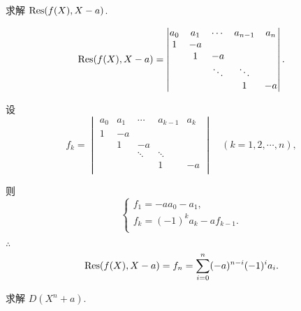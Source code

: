 \documentclass[UTF8]{ctexart}
\begin{document}
\begin{exercise}\label{ex2.7}
    求解 $\operatorname{Res} (f(X),X-a)$.
\end{exercise}
\begin{solution}
    \[\operatorname{Res} (f(X),X-a)=\begin{vmatrix}
        a_0 & a_1 & \cdots & a_{n-1} & a_n \\
        1 & -a \\
        & 1 & -a \\
        && \ddots & \ddots \\
        &&& 1 & -a \\
    \end{vmatrix}.\]

    设
    \[f_k=\begin{vmatrix}
        a_0 & a_1 & \cdots & a_{k-1} & a_k \\
        1 & -a \\
        & 1 & -a \\
        && \ddots & \ddots \\
        &&& 1 & -a \\
    \end{vmatrix}\quad(k=1,2,\cdots,n),\]

    则
    \[\begin{cases}
        f_1=-aa_0-a_1, \\
        f_k=(-1)^ka_k-af_{k-1}. \\
    \end{cases}\]

    $\therefore$
    \[\operatorname{Res} (f(X),X-a)=f_n=\sum\limits_{i=0}^n(-a)^{n-i}(-1)^ia_i.\]
\end{solution}
\begin{exercise}\label{ex2.8}
    求解 $D(X^n+a)$.
\end{exercise}
\end{document}
